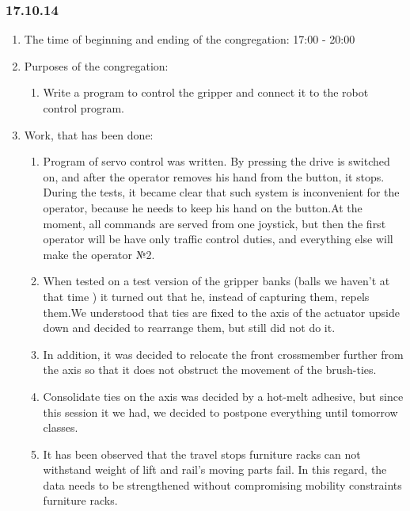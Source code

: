 
\subsubsection{17.10.14}

\begin{enumerate}
	\item The time of beginning and ending of the congregation:
	17:00 - 20:00
	\item Purposes of the congregation:
	\begin{enumerate}
	  \item Write a program to control the gripper and connect it to the robot control program.
	  
    \end{enumerate}
    
	\item Work, that has been done:
	\begin{enumerate}
	  \item Program of servo control was written. By pressing the drive is switched on, and after the operator removes his hand from the button, it stops. During the tests, it became clear that such system is inconvenient for the operator, because he needs to keep his hand on the button.At the moment, all commands are served from one joystick, but then the first operator will be have only traffic control duties, and everything else will make the operator №2.
      
      \item When tested on a test version of the gripper banks (balls we haven't at that time ) it turned out that he, instead of capturing them, repels them.We understood that ties are fixed to the axis of the actuator upside down and decided to rearrange them, but still did not do it.
      
      \item In addition, it was decided to relocate the front crossmember further from the axis so that it does not obstruct the movement of the brush-ties.
      
      \item Consolidate ties on the axis was decided by a hot-melt adhesive, but since this session it we had, we decided to postpone everything until tomorrow classes.
      
      \item It has been observed that the travel stops furniture racks can not withstand weight of lift and rail's moving parts fail. In this regard, the data needs to be strengthened without compromising mobility constraints furniture racks.
      

\end{enumerate}
\end{enumerate}

